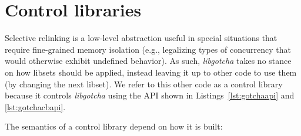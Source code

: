\section{Control libraries}
\label{sec:libgotcha:control}

Selective relinking is a low-level abstraction useful in
special situations that require fine-grained memory isolation (e.g., legalizing types
of concurrency that would otherwise exhibit undefined behavior).
As such, \textit{libgotcha} takes no stance on
how libsets should be applied, instead leaving it up to other code to use them (by
changing the next libset).  We refer to this other code as a control library because
it controls \textit{libgotcha} using the API shown in Listings~\ref{lst:gotchaapi}
and \ref{lst:gotchacbapi}.

The semantics of a control library depend on how it is built:
